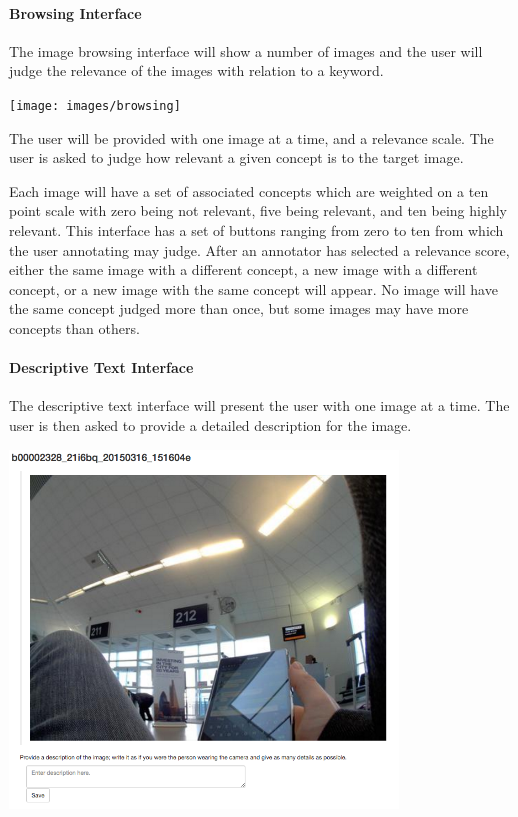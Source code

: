 \documentclass[12pt,a4paper]{article}
\begin{document}
\paragraph{Browsing Interface}
The image browsing interface will show a number of images and the user will judge the relevance of the images with relation to a keyword.

\begin{center}
    \texttt{[image: images/browsing]}
\end{center}

The user will be provided with one image at a time, and a relevance scale. The user is asked to judge how relevant a given concept is to the target image. 

Each image will have a set of associated concepts which are weighted on a ten point scale with zero being not relevant, five being relevant, and ten being highly relevant. This interface has a set of buttons ranging from zero to ten from which the user annotating may judge. After an annotator has selected a relevance score, either the same image with a different concept, a new image with a different concept, or a new image with the same concept will appear. No image will have the same concept judged more than once, but some images may have more concepts than others.

\paragraph{Descriptive Text Interface}
The descriptive text interface will present the user with one image at a time. The user is then asked to provide a detailed description for the image.

\begin{center}
    \includegraphics[width=390px]{images/descriptive}
\end{center}
\end{document}
